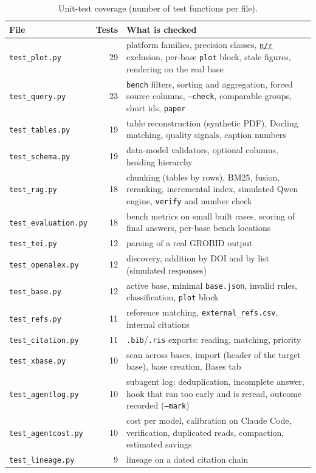 \documentclass[11pt,a4paper]{article}
\newcommand{\cmd}[1]{\texttt{#1}}
\newcommand{\gl}[2]{\hyperlink{gl:#1}{\textcolor{glcolor}{#2}}}
\newcommand{\nr}{\gl{nr}{\texttt{n/r}}}
\begin{document}
\begin{table}[ht]
\centering
\caption{Unit-test coverage (number of test functions per file).}
\label{tab:tests}
\small
\begin{tabularx}{\linewidth}{@{}lrL@{}}
\toprule
File & Tests & What is checked \\
\midrule
\cmd{test\_plot.py} & 29 & platform families, precision classes, \nr{} exclusion, per-base \cmd{plot} block, stale figures, rendering on the real base \\
\cmd{test\_query.py} & 23 & \cmd{bench} filters, sorting and aggregation, forced source columns, \cmd{--check}, comparable groups, short ids, \cmd{paper} \\
\cmd{test\_tables.py} & 19 & table reconstruction (synthetic PDF), Docling matching, quality signals, caption numbers \\
\cmd{test\_schema.py} & 19 & data-model validators, optional columns, heading hierarchy \\
\cmd{test\_rag.py} & 18 & chunking (tables by rows), BM25, fusion, reranking, incremental index, simulated Qwen engine, \cmd{verify} and number check \\
\cmd{test\_evaluation.py} & 18 & bench metrics on small built cases, scoring of final answers, per-base bench locations \\
\cmd{test\_tei.py} & 12 & parsing of a real GROBID output \\
\cmd{test\_openalex.py} & 12 & discovery, addition by DOI and by list (simulated responses) \\
\cmd{test\_base.py} & 12 & active base, minimal \cmd{base.json}, invalid rules, classification, \cmd{plot} block \\
\cmd{test\_refs.py} & 11 & reference matching, \cmd{external\_refs.csv}, internal citations \\
\cmd{test\_citation.py} & 11 & \cmd{.bib}/\cmd{.ris} exports: reading, matching, priority \\
\cmd{test\_xbase.py} & 10 & scan across bases, import (header of the target base), base creation, Bases tab \\
\cmd{test\_agentlog.py} & 10 & subagent log: deduplication, incomplete answer, hook that ran too early and is reread, outcome recorded (\cmd{--mark}) \\
\cmd{test\_agentcost.py} & 10 & cost per model, calibration on Claude Code, verification, duplicated reads, compaction, estimated savings \\
\cmd{test\_lineage.py} & 9 & lineage on a dated citation chain \\

\end{tabularx}
\end{table}
\end{document}
